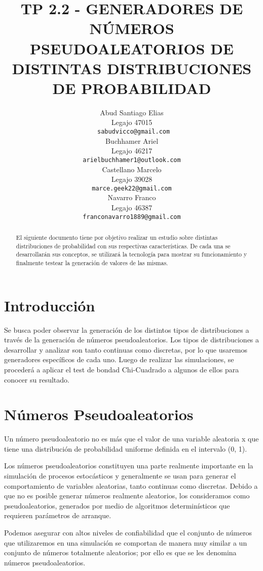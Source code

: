 \documentclass{article}
\title{TP 2.2 - GENERADORES DE NÚMEROS PSEUDOALEATORIOS DE DISTINTAS DISTRIBUCIONES DE PROBABILIDAD}
\author{
    Abud Santiago Elias \\
    Legajo 47015 \\
    \texttt{ sabudvicco@gmail.com} \\
    \And
    Buchhamer Ariel \\
    Legajo 46217\\
    \texttt{arielbuchhamer1@outlook.com} \\
    \And
    Castellano Marcelo \\
    Legajo 39028 \\
    \texttt{marce.geek22@gmail.com} \\
    \And
    Navarro Franco \\
    Legajo 46387 \\
    \texttt{franconavarro1889@gmail.com} \\
}
\begin{document}
  \maketitle
  \begin{abstract}
    El siguiente documento tiene por objetivo realizar un estudio sobre distintas distribuciones de probabilidad con sus respectivas características. De cada una se desarrollarán sus conceptos, se utilizará la tecnología para mostrar su funcionamiento y finalmente testear la generación de valores de las mismas.\end{abstract}





  \section{Introducción}
  \label{sec:introducción}
  Se busca poder observar la generación de los distintos tipos de distribuciones a través de la generación
    de números pseudoaleatorios. Los tipos de distribuciones a desarrollar y analizar son tanto continuas como discretas, por lo que usaremos generadores específicos de cada uno.
    Luego de realizar las simulaciones, se procederá a aplicar el test de bondad Chi-Cuadrado a algunos de ellos para conocer su resultado.


  \section{Números Pseudoaleatorios}
  \label{sec:headings}
  Un número pseudoaleatorio no es más que el valor de una variable aleatoria x que tiene una distribución de probabilidad uniforme definida en el intervalo (0, 1).

  Los números pseudoaleatorios constituyen una parte realmente importante en la simulación de procesos estocásticos y generalmente se usan para generar el comportamiento de variables aleatorias, tanto continuas como discretas. Debido a que no es posible generar números realmente aleatorios, los consideramos como pseudoaleatorios, generados por medio de algoritmos determinísticos que requieren parámetros de arranque.

  Podemos asegurar con altos niveles de confiabilidad que el conjunto de números que utilizaremos en una simulación se comportan de manera muy similar a un conjunto de números totalmente aleatorios; por ello es que se les denomina números pseudoaleatorios.
\newpage
\end{document}
